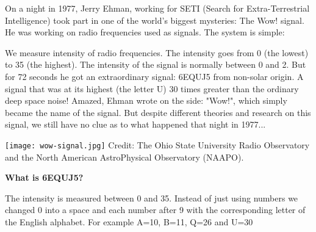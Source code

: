 \begin{tcolorbox}[colback=red!5,colframe=DarkRed!40!black,title=\textbf{The wow! signal: Our first extra-terrestrial communication? \cite{wow}}]

On a night in 1977, Jerry Ehman, working for SETI (Search for Extra-Terrestrial Intelligence) took part in one of the world's biggest mysteries: The Wow! signal. 
He was working on radio frequencies used as signals. The system is simple:

We measure intensity of radio frequencies. The intensity goes from 0 (the lowest) to 35 (the highest).
The intensity of the signal is normally between 0 and 2.
But for 72 seconds he got an extraordinary signal: 6EQUJ5 from non-solar origin.
A signal that was at its highest (the letter U) 30 times greater than the ordinary deep space noise!
Amazed, Ehman wrote on the side: "Wow!", which simply became the name of the signal.
But despite different theories and research on this signal, we still have no clue as to what happened that night in 1977...

\begin{center}
	\texttt{[image: wow-signal.jpg]}
	\tiny{Credit: The Ohio State University Radio Observatory and the North American AstroPhysical Observatory (NAAPO).}
\end{center}

\textbf{What is 6EQUJ5?}

The intensity is measured between 0 and 35.
Instead of just using numbers we changed 0 into a space and each number after 9 with the corresponding letter of the English alphabet.
For example A=10, B=11, Q=26 and U=30
\end{tcolorbox}